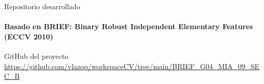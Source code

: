 \documentclass{beamer}
\begin{document}
\begin{frame}{Repositorio desarrollado} \framesubtitle{Basado en BRIEF: Binary Robust Independent Elementary Features (ECCV 2010)} 
    \begin{block}{GitHub del proyecto} \centering \scriptsize \url{https://github.com/vlazop/workspaceCV/tree/main/BRIEF_G04_MIA_09_SEC_B} \end{block}
\end{frame}


\backmatter
\end{document}
